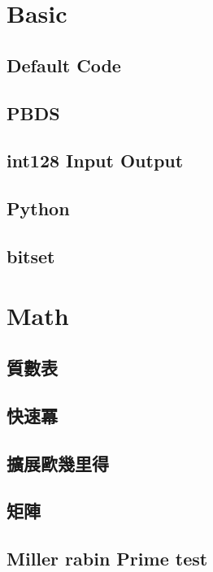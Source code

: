 \section{Basic}
\subsection{Default Code}

\subsection{PBDS}

\subsection{int128 Input Output}

\subsection{Python}

\subsection{bitset}


\section{Math}
\subsection{質數表} 

\subsection{快速冪} 

\subsection{擴展歐幾里得} 

\subsection{矩陣} 

\subsection{Miller rabin Prime test} 

